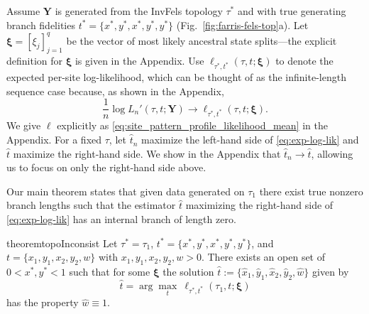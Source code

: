 \documentclass[11pt]{article}
\newcommand{\fullAlignment}{\mathbf{Y}}
\newcommand{\nCols}{n}
\newcommand{\nSiteSplits}{q}
\begin{document}
Assume $\fullAlignment$ is generated from the InvFels topology $\tau^*$ and with true generating branch fidelities $t^*=\{x^*, y^*, x^*, y^*, y^*\}$ (Fig.~\ref{fig:farris-fels-top}a).
Let $\boldsymbol\xi = [\xi_j]_{j=1}^\nSiteSplits$ be the vector of most likely ancestral state splits---the explicit definition for $\boldsymbol\xi$ is given in the Appendix.
Use $\ell_{\tau^*,t^*}(\tau, t; \boldsymbol\xi)$ to denote the expected per-site log-likelihood, which can be thought of as the infinite-length sequence case because, as shown in the Appendix,
\begin{equation}
\label{eq:exp-log-lik}
\frac{1}{n}\log L_\nCols'(\tau, t; \fullAlignment) \rightarrow \ell_{\tau^*,t^*}(\tau, t; \boldsymbol\xi).
\end{equation}
We give $\ell$ explicitly as \eqref{eq:site_pattern_profile_likelihood_mean} in the Appendix.
For a fixed $\tau$, let $\hat{t}_\nCols$ maximize the left-hand side of \eqref{eq:exp-log-lik} and $\hat{t}$ maximize the right-hand side.
We show in the Appendix that $\hat{t}_\nCols \rightarrow \hat{t}$, allowing us to focus on only the right-hand side above.


Our main theorem states that given data generated on $\tau_1$ there exist true nonzero branch lengths such that the estimator $\hat{t}$ maximizing the right-hand side of \eqref{eq:exp-log-lik} has an internal branch of length zero.
\begin{restatable}{theorem}{topoInconsist}
\label{thm:main_theorem}
Let $\tau^*=\tau_1$, $t^*=\{x^*, y^*, x^*, y^*, y^*\}$, and $t=\{x_1, y_1, x_2, y_2, w\}$ with $x_1, y_1, x_2, y_2, w > 0$.
There exists an open set of $0 < x^*, y^* < 1$ such that for some $\boldsymbol\xi$ the solution $\hat{t} := \{\hat{x}_1,\hat{y}_1,\hat{x}_2,\hat{y}_2,\hat{w}\}$ given by
\[
\hat{t} = \arg\max_{t} \ \ell_{\tau^*,t^*}(\tau_1, t; \boldsymbol\xi)
\]
has the property $\hat{w}\equiv 1$.
\end{restatable}
\end{document}
